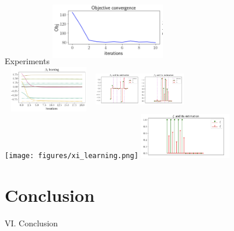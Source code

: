 \documentclass{beamer}
\begin{document}
\begin{frame}{Experiments}
  \centering
  \includegraphics[height= 3cm, width=5cm]{figures/likelihood.png} \hspace{1cm} \\
  \vspace{0.5cm}
  \includegraphics[height= 2cm, width=4cm]{figures/beta_learning.png} \hspace{0.7cm}
  \includegraphics[height= 2cm, width=4cm]{figures/beta_estimation.png} \\
  \vspace{0.5cm}
  \texttt{[image: figures/xi\_learning.png]} \hspace{0.7cm}
  \includegraphics[height= 2cm, width=4cm]{figures/xi_estimation.png} \\
\end{frame}

\section{Conclusion}

\begin{frame}[noframenumbering]
\Large \centering
\textcolor{blue_pres}{VI.} Conclusion
\end{frame}
\end{document}
